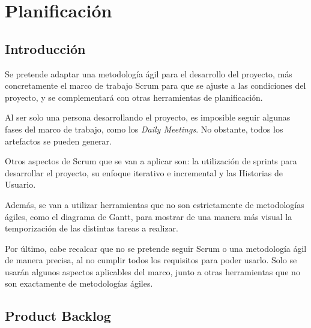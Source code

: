 \chapter{Planificación}

\section{Introducción}

Se pretende adaptar una metodología ágil para el desarrollo del proyecto, más concretamente el marco de trabajo Scrum para que se ajuste a las condiciones del proyecto, y se complementará con otras herramientas de planificación.

\bigskip

Al ser solo una persona desarrollando el proyecto, es imposible seguir algunas fases del marco de trabajo, como los \textit{Daily Meetings}. No obstante, todos los artefactos se pueden generar.

\bigskip

Otros aspectos de Scrum que se van a aplicar son: la utilización de sprints para desarrollar el proyecto, su enfoque iterativo e incremental y las Historias de Usuario.

\bigskip

Además, se van a utilizar herramientas que no son estrictamente de metodologías ágiles, como el diagrama de Gantt, para mostrar de una manera más visual la temporización de las distintas tareas a realizar.

\bigskip

Por último, cabe recalcar que no se pretende seguir Scrum o una metodología ágil de manera precisa, al no cumplir todos los requisitos para poder usarlo. Solo se usarán algunos aspectos aplicables del marco, junto a otras herramientas que no son exactamente de metodologías ágiles.


\newpage

\section{Product Backlog}

